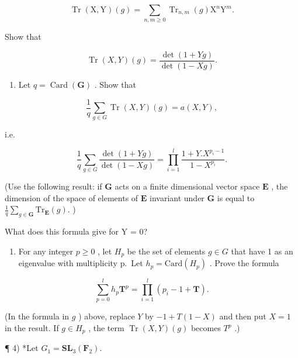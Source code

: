 \[
\operatorname{Tr} (\mathrm{X}, \mathrm{Y}) (g) = \sum_ {n, m \geqslant 0} \operatorname{Tr} _ {n, m} (g) \mathrm{X} ^ {n} \mathrm{Y} ^ {m}.
\]

Show that

\[
\operatorname{Tr} (X, Y) (g) = \frac {\det (1 + Y g)}{\det (1 - X g)}.
\]

\begin{enumerate}
\def\labelenumi{\alph{enumi})}
\setcounter{enumi}{6}
\tightlist
\item
  Let \(q = \operatorname{Card}(\mathbf{G})\) . Show that
\end{enumerate}

\[
\frac {1}{q} \sum_ {g \in G} \operatorname{Tr} (X, Y) (g) = a (X, Y),
\]

i.e.

\[
\frac {1}{q} \sum_ {g \in G} \frac {\det (1 + Y g)}{\det (1 - X g)} = \prod_ {i = 1} ^ {l} \frac {1 + Y . X ^ {p _ {i} - 1}}{1 - X ^ {p _ {i}}}.
\]

(Use the following result: if \(\mathbf{G}\) acts on a finite dimensional vector space \(\mathbf{E}\) , the dimension of the space of elements of \(\mathbf{E}\) invariant under \(\mathbf{G}\) is equal to \(\frac{1}{q}\sum_{g\in \mathbf{G}}\mathrm{Tr}_{\mathbf{E}}(g).\) )

What does this formula give for Y = 0?

\begin{enumerate}
\def\labelenumi{\alph{enumi})}
\setcounter{enumi}{7}
\tightlist
\item
  For any integer \(p \geqslant 0\) , let \(H_{p}\) be the set of elements \(g \in G\) that have 1 as an eigenvalue with multiplicity p.~Let \(h_{p} = \text{Card}(H_{p})\) . Prove the formula
\end{enumerate}

\[
\sum_ {p = 0} ^ {l} h _ {p} \mathbf {T} ^ {p} = \prod_ {i = 1} ^ {l} (p _ {i} - 1 + \mathbf {T}).
\]

(In the formula in \(g\) ) above, replace \(Y\) by \(-1 + T(1 - X)\) and then put \(X = 1\) in the result. If \(g \in H_p\) , the term \(\operatorname{Tr}(X, Y)(g)\) becomes \(T^p\) .)

¶ 4) *Let \(G _ {1} = \mathbf {S L} _ {3} (\mathbf {F} _ {2})\).

